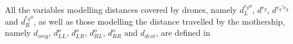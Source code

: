 \noindent
All the variables modelling  distances covered by drones, namely $d_L^{e_go}$, $d^{e_g}$, $d^{e_g'e_g}$ and $d_R^{e_go}$,  as well as those modelling the distance travelled by the mothership, namely $d_{orig}$, $d_{LL}^o$, $d_{LR}^o$, $d_{RL}^o$, $d_{RR}^o$ and $d_{dest}$, are defined in  
 
 
 

